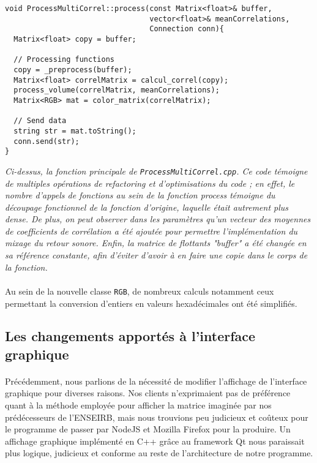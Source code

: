 \begin{lstlisting}
void ProcessMultiCorrel::process(const Matrix<float>& buffer,
                                 vector<float>& meanCorrelations,
                                 Connection conn){
  Matrix<float> copy = buffer;

  // Processing functions
  copy = _preprocess(buffer);
  Matrix<float> correlMatrix = calcul_correl(copy);
  process_volume(correlMatrix, meanCorrelations);
  Matrix<RGB> mat = color_matrix(correlMatrix);

  // Send data
  string str = mat.toString();
  conn.send(str);
}
\end{lstlisting}
\begin{center}
  \textit{Ci-dessus, la fonction principale de
    \verb!ProcessMultiCorrel.cpp!. Ce code témoigne de multiples
    opérations de refactoring et d'optimisations du code ; en effet,
    le nombre d'appels de fonctions au sein de la fonction process témoigne du
    découpage fonctionnel de la fonction d'origine, laquelle était autrement
    plus dense. De plus, on peut observer dans les paramètres qu'un
    vecteur des moyennes de coefficients de corrélation a été ajoutée
    pour permettre l'implémentation du mixage du retour sonore. Enfin,
    la matrice de flottants "buffer" a été changée en sa référence
    constante, afin d'éviter d'avoir à en faire une copie dans le
    corps de la fonction.}
\end{center}

\paragraph{}
Au sein de la nouvelle classe \verb!RGB!, de nombreux calculs notamment ceux permettant la conversion d'entiers en valeurs hexadécimales ont été simplifiés.

\subsection{Les changements apportés à l'interface graphique}
\paragraph{}
Précédemment, nous parlions de la nécessité de modifier l'affichage de
l'interface graphique pour diverses raisons. Nos clients n'exprimaient
pas de préférence quant à la méthode employée pour afficher la matrice
imaginée par nos prédécesseurs de l'ENSEIRB, mais nous trouvions peu
judicieux et coûteux pour le programme de passer par NodeJS et Mozilla
Firefox pour la produire. Un affichage graphique implémenté en C++
grâce au framework Qt nous paraissait plus logique, judicieux et
conforme au reste de l'architecture de notre programme.

